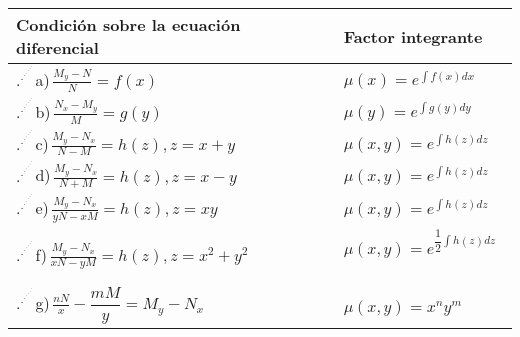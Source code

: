 \documentclass[10pt,a4paper]{article}
\begin{document}
{{{{{{{{{{{{\begin{table}[h]
\centering
   \begin{tabular}{|m{8cm}|m{4cm}|}
   \hline
     Condición sobre la ecuación diferencial & Factor integrante\\
     \hline\hspace{1cm}\vspace{0.2cm}
     $.^{.^{.^{.^{.^{.^{.}}}}}}$a)\,$\frac{M_y-N}{N}=f(x)$ & $\mu(x)=e^{\int f(x)dx}$\vspace{0.2cm}
     \,\\
     \hline\hspace{1cm}\vspace{0.2cm}
     $.^{.^{.^{.^{.^{.^{.}}}}}}$b)\,$\frac{N_x-M_y}{M}=g(y)$ & $\mu(y)=e^{\int g(y)dy}$\vspace{0.2cm}
     \,\\
     \hline\hspace{1cm}\vspace{0.2cm}
     $.^{.^{.^{.^{.^{.^{.}}}}}}$c)\,$\frac{M_y-N_x}{N-M}=h(z),z=x+y$ & $\mu(x,y)=e^{\int h(z)dz}$\vspace{0.2cm}
     \,\\
     \hline\hspace{1cm}\vspace{0.2cm}
     $.^{.^{.^{.^{.^{.^{.}}}}}}$d)\,$\frac{M_y-N_x}{N+M}=h(z),z=x-y$ & $\mu(x,y)=e^{\int h(z)dz}$\vspace{0.2cm}
     \,\\
     \hline\hspace{1cm}\vspace{0.2cm}
     $.^{.^{.^{.^{.^{.^{.}}}}}}$e)\,$\frac{M_y-N_x}{yN-xM}=h(z),z=xy$ & $\mu(x,y)=e^{\int h(z)dz}$\vspace{0.2cm}\\
     \hline\hspace{1cm}\vspace{0.2cm}
     $.^{.^{.^{.^{.^{.^{.}}}}}}$f)\,$\frac{M_y-N_x}{xN-yM}=h(z),z=x^2+y^2$ & $\mu(x,y)=e^{\dfrac{1}{2}\int h(z)dz}$\vspace{0.2cm}
     \,\\
     \hline\hspace{1cm}\vspace{0.2cm}
     $.^{.^{.^{.^{.^{.^{.}}}}}}$g)\,$\frac{nN}{x}-\dfrac{mM}{y}=M_y-N_x$ & $\mu(x,y)=x^{n}y^m$\vspace{0.2cm}
     \,\\
     \hline

   \end{tabular}
\end{table}

}}}}}}}}}}}}
\end{document}
